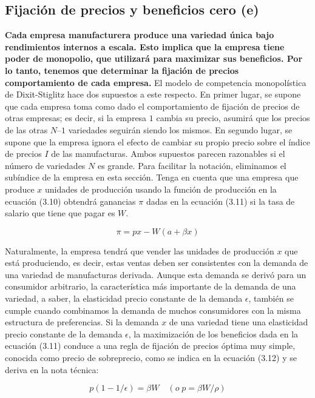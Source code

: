 \subsection{Fijación de precios y beneficios cero (e)}
\textbf{Cada empresa manufacturera produce una variedad única bajo rendimientos internos a escala. Esto implica que la empresa tiene poder de monopolio, que utilizará para maximizar sus beneficios. Por lo tanto, tenemos que determinar la fijación de precios comportamiento de cada empresa.} El modelo de competencia monopolística de Dixit-Stiglitz hace dos supuestos a este respecto. En primer lugar, se supone que cada empresa toma como dado el comportamiento de fijación de precios de otras empresas; es decir, si la empresa $1$ cambia su precio, asumirá que los precios de las otras $N–1$ variedades seguirán siendo los mismos. En segundo lugar, se supone que la empresa ignora el efecto de cambiar su propio precio sobre el índice de precios $I$ de las manufacturas. Ambos supuestos parecen razonables si el número de variedades $N$ es grande. Para facilitar la notación, eliminamos el subíndice de la empresa en esta sección. Tenga en cuenta que una empresa que produce $x$ unidades de producción usando la función de producción en la ecuación (3.10) obtendrá ganancias $\pi$ dadas en la ecuación (3.11) si la tasa de salario que tiene que pagar es $W$.

\begin{equation}
    \pi = px-W(a+\beta x)
\end{equation}

Naturalmente, la empresa tendrá que vender las unidades de producción $x$ que está produciendo, es decir, estas ventas deben ser consistentes con la demanda de una variedad de manufacturas derivada. Aunque esta demanda se derivó para un consumidor arbitrario, la característica más importante de la demanda de una variedad, a saber, la elasticidad precio constante de la demanda $\epsilon$, también se cumple cuando combinamos la demanda de muchos consumidores con la misma estructura de preferencias. Si la demanda $x$ de una variedad tiene una elasticidad precio constante de la demanda $\epsilon$, la maximización de los beneficios dada en la ecuación (3.11) conduce a una regla de fijación de precios óptima muy simple, conocida como precio de sobreprecio, como se indica en la ecuación (3.12) y se deriva en la nota técnica:

\begin{equation}
    p(1-1/\epsilon)=\beta W \quad (o\; p=\beta W / \rho)
\end{equation}

